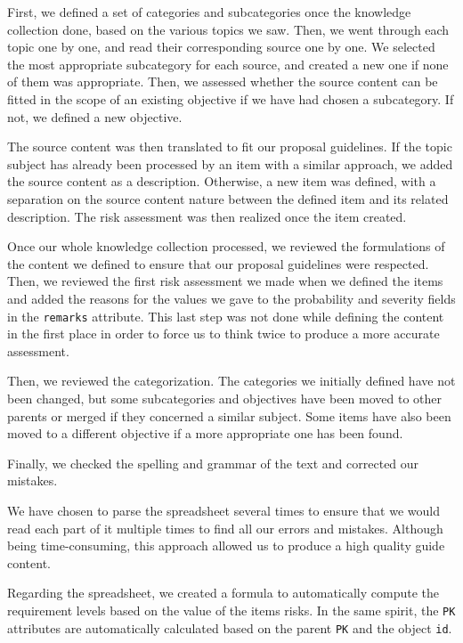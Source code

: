 First, we defined a set of categories and subcategories once the knowledge collection done, based on the various topics we saw. Then, we went through each topic one by one, and read their corresponding source one by one. We selected the most appropriate subcategory for each source, and created a new one if none of them was appropriate. Then, we assessed whether the source content can be fitted in the scope of an existing objective if we have had chosen a subcategory. If not, we defined a new objective.

The source content was then translated to fit our proposal guidelines. If the topic subject has already been processed by an item with a similar approach, we added the source content as a description. Otherwise, a new item was defined, with a separation on the source content nature between the defined item and its related description. The risk assessment was then realized once the item created.

Once our whole knowledge collection processed, we reviewed the formulations of the content we defined to ensure that our proposal guidelines were respected. Then, we reviewed the first risk assessment we made when we defined the items and added the reasons for the values we gave to the probability and severity fields in the \texttt{remarks} attribute. This last step was not done while defining the content in the first place in order to force us to think twice to produce a more accurate assessment.

Then, we reviewed the categorization. The categories we initially defined have not been changed, but some subcategories and objectives have been moved to other parents or merged if they concerned a similar subject. Some items have also been moved to a different objective if a more appropriate one has been found.

Finally, we checked the spelling and grammar of the text and corrected our mistakes.

We have chosen to parse the spreadsheet several times to ensure that we would read each part of it multiple times to find all our errors and mistakes. Although being time-consuming, this approach allowed us to produce a high quality guide content.

Regarding the spreadsheet, we created a formula to automatically compute the requirement levels based on the value of the items risks. In the same spirit, the \texttt{PK} attributes are automatically calculated based on the parent \texttt{PK} and the object \texttt{id}.

